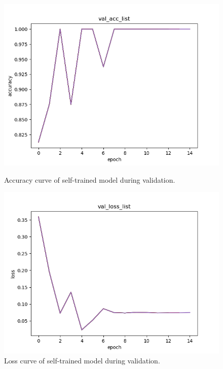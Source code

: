 \documentclass{article}
\begin{document}
\begin{figure}[!htb]
  \begin{minipage}[t]{0.45\textwidth}
    \centering
    \includegraphics[width=\linewidth]{./results_train/val_acc_list.png}
    \caption{Accuracy curve of self-trained model during validation.}
    \label{fig:Appendix3}
  \end{minipage}
  \hfill
  \begin{minipage}[t]{0.45\textwidth}
    \centering
    \includegraphics[width=\linewidth]{./results_train/val_loss_list.png}
    \caption{Loss curve of self-trained model during validation.}
    \label{fig:Appendix4}
  \end{minipage}
\end{figure}
\end{document}
